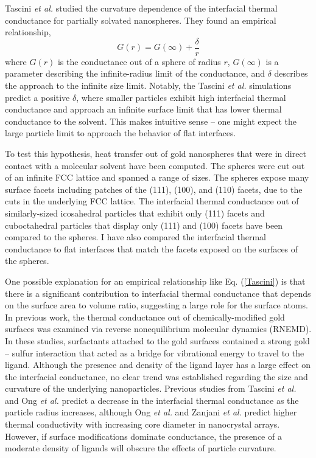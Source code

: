 Tascini \textit{et al.}\cite{Tascini2016} studied the
curvature dependence of the interfacial thermal conductance for
partially solvated nanospheres. They found an empirical relationship,
\begin{equation}
G(r) = G(\infty) + \frac{\delta}{r}
\label{Tascini}
\end{equation}
where $G(r)$ is the conductance out of a sphere of radius $r$,
$G(\infty)$ is a parameter describing the infinite-radius limit of the
conductance, and $\delta$ describes the approach to the infinite size
limit. Notably, the Tascini \textit{et al.} simulations predict a
positive $\delta$, where smaller particles exhibit high interfacial
thermal conductance and approach an infinite surface limit that has
lower thermal conductance to the solvent. This makes intuitive sense
-- one might expect the large particle limit to approach the behavior
of flat interfaces.

To test this hypothesis, heat transfer out of gold
nanospheres that were in direct contact with a molecular solvent have been computed. The
spheres were cut out of an infinite FCC lattice and spanned a range of
sizes.  The spheres
expose many surface facets including patches of the (111), (100), and
(110) facets, due to the cuts in the underlying FCC lattice.
The interfacial thermal conductance out of similarly-sized
 icosahedral particles that exhibit only (111) facets and cuboctahedral particles that display
only (111) and (100) facets have been compared to the spheres. 
I have also compared the interfacial thermal conductance to flat interfaces 
that match the facets exposed on the surfaces of the spheres.

One possible explanation for an empirical relationship like
Eq. (\ref{Tascini}) is that there is a significant contribution to
interfacial thermal conductance that depends on the surface area to
volume ratio, suggesting a large role for the surface atoms. In 
previous work, the thermal conductance out of chemically-modified gold
surfaces was examined via reverse nonequilibrium molecular dynamics
(RNEMD). \cite{kuang:AuThl,Stocker:2014qq,Stocker2016} %
In these studies, surfactants attached to the gold surfaces contained
a strong gold -- sulfur interaction that acted as a bridge for
vibrational energy to travel to the ligand.  Although the presence and
density of the ligand layer has a large effect on the interfacial
conductance, no clear trend was established regarding the size and
curvature of the underlying nanoparticles. Previous studies from
Tascini \textit{et al.}\cite{Tascini2016} and Ong \textit{et
  al.}\cite{Ong:2014yq} predict a decrease in the interfacial thermal
conductance as the particle radius increases, although Ong \textit{et
  al.}\cite{Ong:2014yq} and Zanjani \textit{et al.}\cite{Zanjani2014}
predict higher thermal conductivity with increasing core diameter in
nanocrystal arrays. However, if surface modifications dominate
conductance, the presence of a moderate density of ligands will
obscure the effects of particle curvature.

